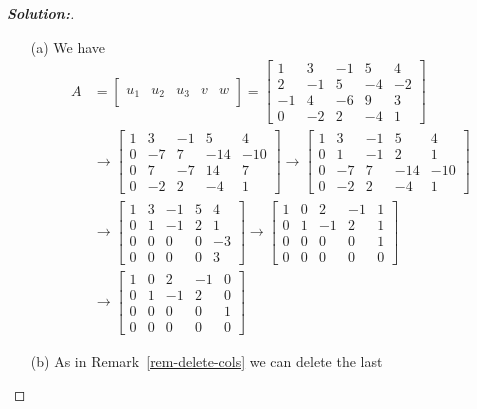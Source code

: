 \documentclass[a4paper]{amsart}
\theoremstyle{definition}
\newenvironment{solution}{\begin{proof}[\textbf{Solution:}] \vphantom{u}}{\end{proof}}
\begin{document}
\begin{solution}
 \begin{itemize}
  \item[(a)] We have
   \begin{align*}
    A  & =
     \left[\begin{array}{c|c|c|c|c}
      &&&&\\u_1&u_2&u_3&v&w\\&&&&
     \end{array}\right]
     =
     \left[\begin{array}{ccccc}
      1&3&-1&5&4\\2&-1&5&-4&-2\\-1&4&-6&9&3\\0&-2&2&-4&1
     \end{array}\right]\\
   & \to
     \left[\begin{array}{ccccc}
      1&3&-1&5&4\\0&-7&7&-14&-10\\0&7&-7&14&7\\0&-2&2&-4&1
     \end{array}\right]
     \to
     \left[\begin{array}{ccccc}
      1&3&-1&5&4\\0&1&-1&2&1\\0&-7&7&-14&-10\\0&-2&2&-4&1
     \end{array}\right]\\
   & \to
     \left[\begin{array}{ccccc}
      1&3&-1&5&4\\0&1&-1&2&1\\0&0&0&0&-3\\0&0&0&0&3
     \end{array}\right]
     \to
     \left[\begin{array}{ccccc}
      1&0&2&-1&1\\0&1&-1&2&1\\0&0&0&0&1\\0&0&0&0&0
     \end{array}\right]\\
   & \to
     \left[\begin{array}{ccccc}
      1&0&2&-1&0\\0&1&-1&2&0\\0&0&0&0&1\\0&0&0&0&0
     \end{array}\right]
   \end{align*}
  \item[(b)] As in Remark~\ref{rem-delete-cols} we can delete the last

\end{itemize}
\end{solution}
\end{document}
